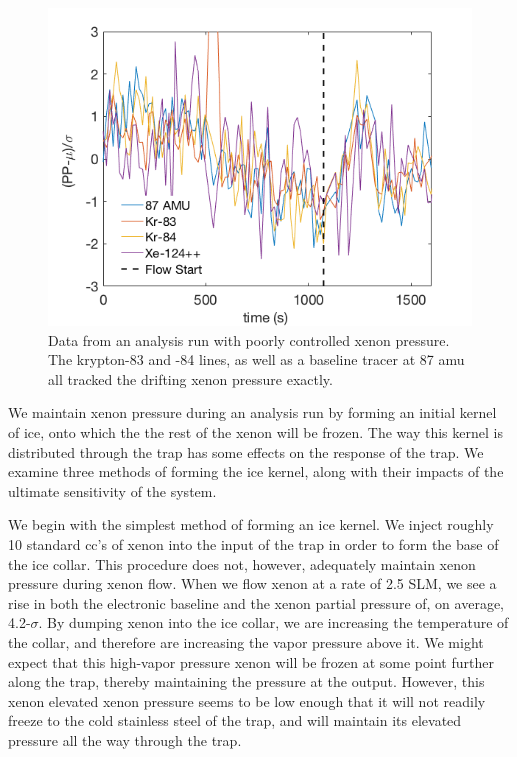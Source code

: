 \begin{figure}[h!]
\centering
\includegraphics[width=\textwidth]{Figures/RGA_noise_correlation.png}
\caption{Data from an analysis run with poorly controlled xenon pressure. The krypton-83 and -84 lines, as well as a baseline tracer at 87 amu all tracked the drifting xenon pressure exactly. } 
\label{fig:correlatednoise}
\end{figure} 

We maintain xenon pressure during an analysis run by forming an initial kernel of ice, onto which the the rest of the xenon will be frozen. The way this kernel is distributed through the trap has some effects on the response of the trap. We examine three methods of forming the ice kernel, along with their impacts of the ultimate sensitivity of the system. 

We begin with the simplest method of forming an ice kernel. We inject roughly 10 standard cc's of xenon into the input of the trap in order to form the base of the ice collar. This procedure does not, however, adequately maintain xenon pressure during xenon flow. When we flow xenon at a rate of 2.5 SLM, we see a rise in both the electronic baseline and the xenon partial pressure of, on average, 4.2-$\sigma$. By dumping xenon into the ice collar, we are increasing the temperature of the collar, and therefore are increasing the vapor pressure above it. We might expect that this high-vapor pressure xenon will be frozen at some point further along the trap, thereby maintaining the pressure at the output. However, this xenon elevated xenon pressure seems to be low enough that it will not readily freeze to the cold stainless steel of the trap, and will maintain its elevated pressure all the way through the trap.

